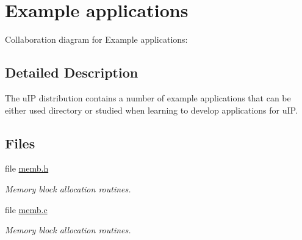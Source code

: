 \hypertarget{a00060}{
\section{Example applications}
\label{a00060}
}


Collaboration diagram for Example applications:

\subsection{Detailed Description}
The u\-IP distribution contains a number of example applications that can be either used directory or studied when learning to develop applications for u\-IP. 



\subsection*{Files}
\begin{CompactItemize}
\item 
file \hyperlink{a00044}{memb.h}
\begin{CompactList}\small\item\em Memory block allocation routines. \item\end{CompactList}

\item 
file \hyperlink{a00043}{memb.c}
\begin{CompactList}\small\item\em Memory block allocation routines. \item\end{CompactList}

\end{CompactItemize}
